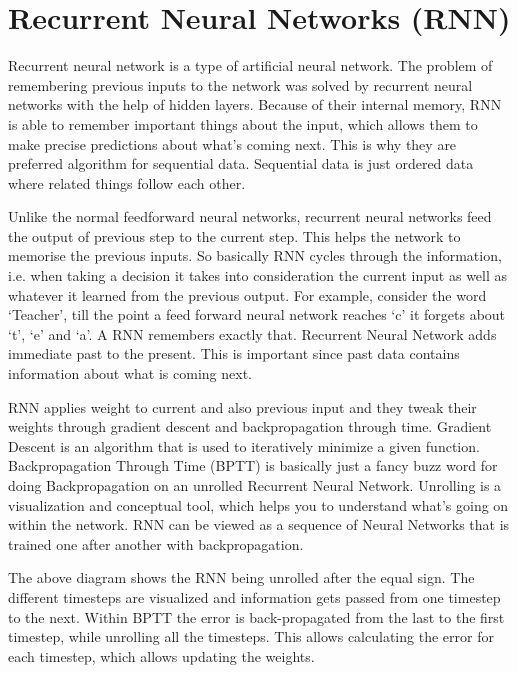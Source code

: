 \section{Recurrent Neural Networks (RNN)}

Recurrent neural network is a type of artificial neural network. The problem of
remembering previous inputs to the network was solved by recurrent neural
networks with the help of hidden layers. Because of their internal memory, RNN
is able to remember important things about the input, which allows them to make
precise predictions about what’s coming next. This is why they are preferred
algorithm for sequential data. Sequential data is just ordered data where
related things follow each other.


Unlike the normal feedforward neural networks, recurrent neural networks feed
the output of previous step to the current step. This helps the network to
memorise the previous inputs. So basically RNN cycles through the information,
i.e. when taking a decision it takes into consideration the current input as
well as whatever it learned from the previous output. For example, consider the
word ‘Teacher’, till the point a feed forward neural network reaches ‘c’ it
forgets about ‘t’, ‘e’ and ‘a’. A RNN remembers exactly that. Recurrent Neural
Network adds immediate past to the present. This is important since past data
contains information about what is coming next. 

RNN applies weight to current and also previous input and they tweak their
weights through gradient descent and backpropagation through time. Gradient
Descent is an algorithm that is used to iteratively minimize a given function.
Backpropagation Through Time (BPTT) is basically just a fancy buzz word for
doing Backpropagation on an unrolled Recurrent Neural Network. Unrolling is a
visualization and conceptual tool, which helps you to understand what’s going on
within the network. RNN can be viewed as a sequence of Neural Networks that is
trained one after another with backpropagation.


The above diagram shows the RNN being unrolled after the equal sign. The
different timesteps are visualized and information gets passed from one timestep
to the next. Within BPTT the error is back-propagated from the last to the first
timestep, while unrolling all the timesteps. This allows calculating the error
for each timestep, which allows updating the weights.

